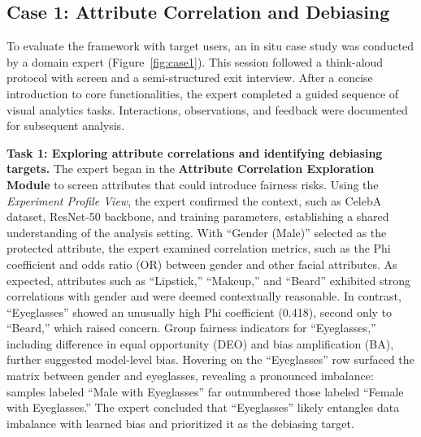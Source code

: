 \documentclass[sigconf]{acmart}
\newcommand{\REVISE}[1]{#1}
\begin{document}
\subsection{Case 1: Attribute Correlation and Debiasing}




\REVISE{To evaluate the framework with target users, an in situ case study was conducted by a domain expert (Figure~\ref{fig:case1}). This session followed a think-aloud protocol with screen and a semi-structured exit interview. After a concise introduction to core functionalities, the expert completed a guided sequence of visual analytics tasks. Interactions, observations, and feedback were documented for subsequent analysis.}


\textbf{Task 1: Exploring attribute correlations and identifying debiasing targets.}
The expert began in the \textbf{Attribute Correlation Exploration Module} to screen attributes that could introduce fairness risks. Using the \textit{Experiment Profile View}, the expert confirmed the context, such as CelebA dataset, ResNet-50 backbone, and training parameters, establishing a shared understanding of the analysis setting. With ``Gender (Male)'' selected as the protected attribute, the expert examined correlation metrics, such as the Phi coefficient and odds ratio (OR) between gender and other facial attributes. As expected, attributes such as ``Lipstick,'' ``Makeup,'' and ``Beard'' exhibited strong correlations with gender and were deemed contextually reasonable. In contrast, ``Eyeglasses'' showed an unusually high Phi coefficient (0.418), second only to ``Beard,'' which raised concern. \REVISE{Group fairness indicators for ``Eyeglasses,'' including difference in equal opportunity (DEO) and bias amplification (BA)}, further suggested model-level bias. Hovering on the ``Eyeglasses'' row surfaced the matrix between gender and eyeglasses, revealing a pronounced imbalance: samples labeled ``Male with Eyeglasses'' far outnumbered those labeled ``Female with Eyeglasses.'' The expert concluded that ``Eyeglasses'' likely entangles data imbalance with learned bias and prioritized it as the debiasing target.
\end{document}
